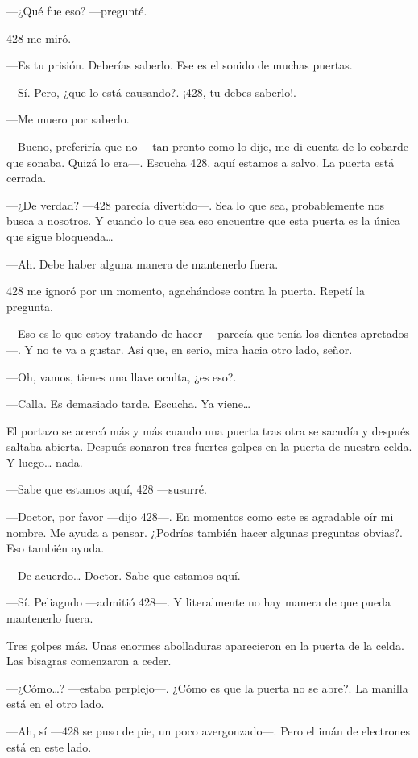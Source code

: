 ---¿Qué fue eso? ---pregunté.

428 me miró.

---Es tu prisión. Deberías saberlo. Ese es el sonido de muchas puertas.

---Sí. Pero, ¿que lo está causando?. ¡428, tu debes saberlo!.

---Me muero por saberlo.

---Bueno, preferiría que no ---tan pronto como lo dije, me di cuenta de
lo cobarde que sonaba. Quizá lo era---. Escucha 428, aquí estamos a
salvo. La puerta está cerrada.

---¿De verdad? ---428 parecía divertido---. Sea lo que sea,
probablemente nos busca a nosotros. Y cuando lo que sea eso encuentre
que esta puerta es la única que sigue bloqueada\ldots{}

---Ah. Debe haber alguna manera de mantenerlo fuera.

428 me ignoró por un momento, agachándose contra la puerta. Repetí la
pregunta.

---Eso es lo que estoy tratando de hacer ---parecía que tenía los
dientes apretados---. Y no te va a gustar. Así que, en serio, mira hacia
otro lado, señor.

---Oh, vamos, tienes una llave oculta, ¿es eso?.

---Calla. Es demasiado tarde. Escucha. Ya viene\ldots{}

El portazo se acercó más y más cuando una puerta tras otra se sacudía y
después saltaba abierta. Después sonaron tres fuertes golpes en la
puerta de nuestra celda. Y luego\ldots{} nada.

---Sabe que estamos aquí, 428 ---susurré.

---Doctor, por favor ---dijo 428---. En momentos como este es agradable
oír mi nombre. Me ayuda a pensar. ¿Podrías también hacer algunas
preguntas obvias?. Eso también ayuda.

---De acuerdo\ldots{} Doctor. Sabe que estamos aquí.

---Sí. Peliagudo ---admitió 428---. Y literalmente no hay manera de que
pueda mantenerlo fuera.

Tres golpes más. Unas enormes abolladuras aparecieron en la puerta de la
celda. Las bisagras comenzaron a ceder.

---¿Cómo\ldots{}? ---estaba perplejo---. ¿Cómo es que la puerta no se
abre?. La manilla está en el otro lado.

---Ah, sí ---428 se puso de pie, un poco avergonzado---. Pero el imán de
electrones está en este lado.

